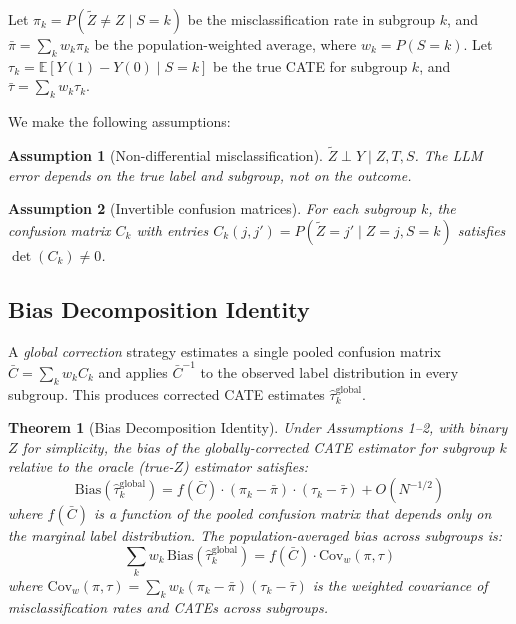 \documentclass[11pt,a4paper]{article}
\newtheorem{theorem}{Theorem}
\newtheorem{assumption}{Assumption}
\newcommand{\E}{\mathbb{E}}
\newcommand{\Cov}{\mathrm{Cov}}
\begin{document}
Let $\pi_k = P(\tilde{Z} \neq Z \mid S = k)$ be the misclassification rate in subgroup $k$, and $\bar{\pi} = \sum_k w_k \pi_k$ be the population-weighted average, where $w_k = P(S=k)$.
Let $\tau_k = \E[Y(1) - Y(0) \mid S = k]$ be the true CATE for subgroup $k$, and $\bar{\tau} = \sum_k w_k \tau_k$.

We make the following assumptions:
\begin{assumption}[Non-differential misclassification]
$\tilde{Z} \perp Y \mid Z, T, S$. The LLM error depends on the true label and subgroup, not on the outcome.
\end{assumption}
\begin{assumption}[Invertible confusion matrices]
For each subgroup $k$, the confusion matrix $C_k$ with entries $C_k(j,j') = P(\tilde{Z}=j' \mid Z=j, S=k)$ satisfies $\det(C_k) \neq 0$.
\end{assumption}

\subsection{Bias Decomposition Identity}

A \emph{global correction} strategy estimates a single pooled confusion matrix $\bar{C} = \sum_k w_k C_k$ and applies $\bar{C}^{-1}$ to the observed label distribution in every subgroup.
This produces corrected CATE estimates $\hat{\tau}_k^{\text{global}}$.

\begin{theorem}[Bias Decomposition Identity]
\label{thm:bias_identity}
Under Assumptions 1--2, with binary $Z$ for simplicity, the bias of the globally-corrected CATE estimator for subgroup $k$ relative to the oracle (true-$Z$) estimator satisfies:
\begin{equation}
\text{Bias}(\hat{\tau}_k^{\text{global}}) = f(\bar{C}) \cdot (\pi_k - \bar{\pi}) \cdot (\tau_k - \bar{\tau}) + O(N^{-1/2})
\label{eq:bias_identity}
\end{equation}
where $f(\bar{C})$ is a function of the pooled confusion matrix that depends only on the marginal label distribution.
The population-averaged bias across subgroups is:
\begin{equation}
\sum_k w_k \, \text{Bias}(\hat{\tau}_k^{\text{global}}) = f(\bar{C}) \cdot \Cov_w(\pi, \tau)
\label{eq:bias_cov}
\end{equation}
where $\Cov_w(\pi,\tau) = \sum_k w_k (\pi_k - \bar{\pi})(\tau_k - \bar{\tau})$ is the weighted covariance of misclassification rates and CATEs across subgroups.
\end{theorem}
\end{document}
